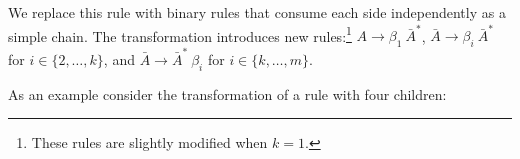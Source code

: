 \documentclass[11pt,letterpaper]{article}
\newcommand{\nonterms}{\mathcal{N}}
\newcommand{\rules}{\mathcal{R}}
\newcommand{\Rule}[3]{#1 \rightarrow #2\ #3}
\newcommand{\RuleA}[3]{#1 \rightarrow #2^*\ #3}
\newcommand{\lpkcomment}[1]{\textcolor{red}{\bf \small [#1 --lpk]}}
\newcommand{\nascomment}[1]{\textcolor{blue}{\bf \small [#1 --nas]}}
\begin{document}



We replace this rule with binary rules that consume each side
independently as a simple chain.
The transformation introduces new rules:\footnote{These rules are slightly modified when $k=1$.}
$\Rule{A}{\beta_1}{\bar{A}^{*}}$, $\Rule{\bar{A}} {\beta_i}{\bar{A}^{*}} $ for $i \in \{2, \ldots, k\}$, and  $\Rule{\bar{A}}{\bar{A}^{*}}{\beta_i}$ for $i \in \{k, \ldots, m\}$.



As an example consider the transformation of a rule with four children:

\begin{center}
\end{center}

\end{document}
